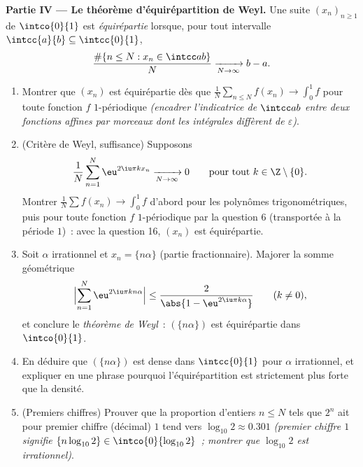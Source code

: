 \begin{problem}
\medskip
\noindent\textbf{Partie IV --- Le théorème d'équirépartition de Weyl.}
Une suite $(x_n)_{n\geq1}$ de $\intco{0}{1}$ est
\emph{équirépartie} lorsque, pour tout intervalle
$\intcc{a}{b} \subseteq \intcc{0}{1}$,
\[
\frac{\#\{n \leq N : x_n \in \intcc ab\}}{N}
\xrightarrow[N\to\infty]{} b - a .
\]
\begin{enumerate}[resume]
  \item Montrer que $(x_n)$ est équirépartie dès que
        $\frac1N\sum_{n\leq N}f(x_n) \to \int_0^1 f$ pour toute
        fonction $f$ \emph{} $1$-périodique \emph{(encadrer
        l'indicatrice de $\intcc ab$ entre deux fonctions
         affines par morceaux dont les intégrales diffèrent
        de $\varepsilon$)}.
  \item (Critère de Weyl, suffisance) Supposons
        \[
        \frac{1}{N}\sum_{n=1}^{N}\eu^{2\iu\pi kx_n}
        \xrightarrow[N\to\infty]{} 0
        \qquad\text{pour tout } k \in \Z\setminus\{0\} .
        \]
        Montrer $\frac1N\sum f(x_n) \to \int_0^1f$ d'abord pour les
        polynômes trigonométriques, puis pour toute fonction $f$
         $1$-périodique par la question 6 (transportée à la
        période $1$)~: avec la question 16, $(x_n)$ est
        équirépartie.
  \item Soit $\alpha$ irrationnel et $x_n = \{n\alpha\}$ (partie
        fractionnaire). Majorer la somme géométrique
        \[
        \Bigl|\sum_{n=1}^{N}\eu^{2\iu\pi kn\alpha}\Bigr|
        \leq \frac{2}{\abs{1 - \eu^{2\iu\pi k\alpha}}}
        \qquad (k \neq 0),
        \]
        et conclure le \emph{théorème de Weyl}~: $(\{n\alpha\})$
        est équirépartie dans $\intco{0}{1}$.
  \item En déduire que $(\{n\alpha\})$ est dense dans
        $\intcc{0}{1}$ pour $\alpha$ irrationnel, et expliquer en
        une phrase pourquoi l'équirépartition est strictement plus
        forte que la densité.
  \item (Premiers chiffres) Prouver que la proportion d'entiers
        $n \leq N$ tels que $2^n$ ait pour premier chiffre
        (décimal) $1$ tend vers $\log_{10}2 \approx 0.301$
        \emph{(premier chiffre $1$ signifie $\{n\log_{10}2\} \in
        \intco{0}{\log_{10}2}$~; montrer que $\log_{10}2$ est
        irrationnel)}.
\end{enumerate}


\end{problem}
